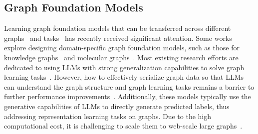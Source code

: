 \subsection{Graph Foundation Models}
Learning graph foundation models that can be transferred across different graphs~\cite{he2024unigraphlearningunifiedcrossdomain,he2024generalizing,qiu2020gcc,hou2024graphalign} and tasks~\cite{hou2023graphmae2,liu2023one,he2024generalizing} has recently received significant attention.
Some works explore designing domain-specific graph foundation models, such as those for knowledge graphs~\cite{galkin2023towards} and molecular graphs~\cite{xiamole}.
Most existing research efforts are dedicated to using LLMs with strong generalization capabilities to solve graph learning tasks~\cite{wang2024can,he2024g,sui2024fidelis,liu2023one}.
However, how to effectively serialize graph data so that LLMs can understand the graph structure and graph learning tasks remains a barrier to further performance improvements~\cite{zhang2024can}.
Additionally, these models typically use the generative capabilities of LLMs to directly generate predicted labels, thus addressing representation learning tasks on graphs. Due to the high computational cost, it is challenging to scale them to web-scale large graphs~\cite{wang2024can,he2024g}.

